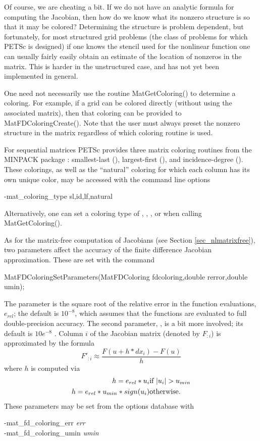 Of course, we are cheating a bit. If we do not have an analytic
formula for computing the Jacobian, then how do we know what its
nonzero structure is so that it may be colored?  Determining the
structure is problem dependent, but fortunately, for most structured grid
problems (the class of problems for which PETSc is designed) if one
knows the stencil used for the nonlinear function one can usually
fairly easily obtain an estimate of the location of nonzeros in
the matrix. This is harder in the unstructured case, and has not yet
been implemented in general.

One need not necessarily use the routine MatGetColoring() to
determine a coloring.  For example, if a grid can be colored directly
(without using the associated matrix), then that coloring can be provided
to MatFDColoringCreate().  Note that the user must always
preset the nonzero structure in the matrix regardless of which
coloring routine is used.

For sequential matrices PETSc provides three matrix coloring routines from the
MINPACK package \cite{more84}: smallest-last (), largest-first (),
and incidence-degree ().  These colorings, as well as the ``natural'' coloring
for which each column has its own unique color, may be accessed with the command line options
\begin{tabbing}
   -mat\_coloring\_type \trl{<}sl,id,lf,natural\trl{>}
\end{tabbing}
Alternatively, one can set a coloring type of , , , or 
when calling MatGetColoring().   
 

As for the matrix-free computation of Jacobians (see Section
\ref{sec_nlmatrixfree}), two parameters affect the accuracy of the
finite difference Jacobian approximation.  These are set with the command
\begin{tabbing}
  MatFDColoringSetParameters(MatFDColoring fdcoloring,double rerror,double umin);
\end{tabbing}
The parameter  is the square root of
the relative error in the function evaluations, $e_{rel}$; the default is $ 10^{-8} $, which assumes
that the functions are evaluated to full double-precision accuracy. The
second parameter, , is a bit more involved; its default is
$ 10e^{-8} $ .  Column $i$ of the Jacobian matrix (denoted by $F_{:i}$) is
approximated by the formula
\[
    F'_{:i} \approx \frac{F(u + h*dx_{i}) - F(u)}{h}
\]
where $ h $ is computed via
\begin{eqnarray*}
        h = e_{rel}*u_{i}             &    \hbox{if }  |u_{i}| > u_{min} \\
        h = e_{rel}*u_{min}*sign(u_{i})  &    \hbox{otherwise}.
\end{eqnarray*}
These parameters may be set from the options database with
\begin{tabbing}
   -mat\_fd\_coloring\_err {\em err}\\
   -mat\_fd\_coloring\_umin {\em umin}
\end{tabbing}
 

